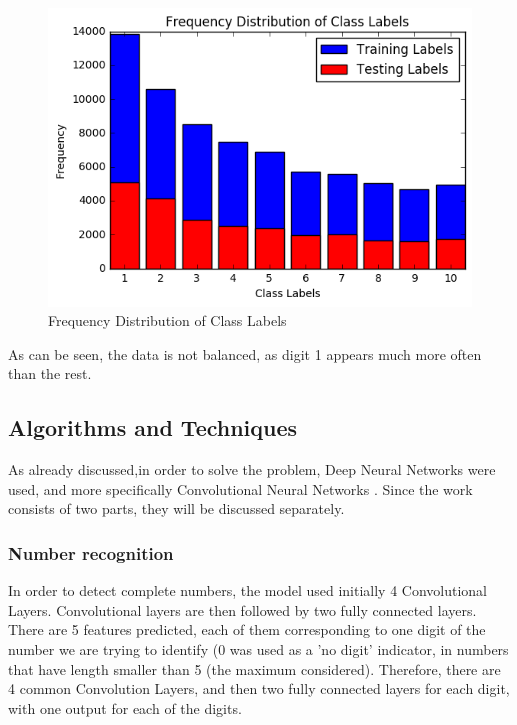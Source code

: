 \documentclass[final,12p,times]{elsarticle}
\begin{document}
\begin{figure}[H]
  \includegraphics[width=1.0\textwidth, center]{distribution.png}
  \caption{Frequency Distribution of Class Labels}
  \label{fig:Fig4.2}
  \end{figure}
  
As can be seen, the data is not balanced, as digit 1 appears much more often than the rest.

\subsection{Algorithms and Techniques}
\label{sec:4.2}
As already discussed,in order to solve the problem, Deep Neural Networks were used, and more specifically 
Convolutional Neural Networks \cite{Fukushima1980} \cite{Lecun98gradient-basedlearning}.
Since the work consists of two parts, they will be discussed separately.

\subsubsection{Number recognition}
\label{sec:4.2.1}
In order to detect complete numbers, the model used initially 4 Convolutional Layers.
Convolutional layers are then followed by two fully connected layers.
There are 5 features predicted, each of them corresponding to one digit of the number we are trying to identify (0 was used as 
a 'no digit' indicator, in numbers that have length smaller than 5 (the maximum considered).
Therefore, there are 4 common Convolution Layers, and then two fully connected layers for each digit, with one output for 
each of the digits.
\end{document}
